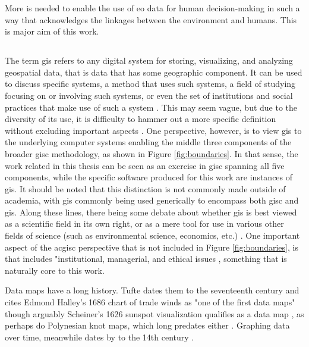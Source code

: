 More is needed to enable the use of \ac{eo} data for human decision-making in such a way that acknowledges the linkages between the environment and humans. This is major aim of this work. 

\subsection{} \label{sec:gis}

The term \ac{gis} refers to any digital system for storing, visualizing, and analyzing geospatial data, that is data that has some geographic component. It can be used to discuss specific systems, a method that uses such systems, a field of studying focusing on or involving such systems, or even the set of institutions and social practices that make use of such a system \cite{sheppardGISSocietyResearch1995}. This may seem vague, but due to the diversity of its use, it is difficulty to hammer out a more specific definition without excluding important aspects \cite{goodchildOverviewDefinitionGIS1992, picklesToolScienceGIS1997, chrismanWhatDoesGIS1999, heikkilaGISDeadLong1998}. One perspective, however, is to view \ac{gis} to the underlying computer systems enabling the middle three components of the broader \ac{gisc} methodology, as shown in Figure \ref{fig:boundaries}. In that sense, the work related in this thesis can be seen as an exercise in \ac{gisc} spanning all five components, while the specific software produced for this work are instances of \ac{gis}. It should be noted that this distinction is not commonly made outside of academia, with \ac{gis} commonly being used generically to encompass both \ac{gisc} and \ac{gis}. Along these lines, there being some debate about whether \ac{gis} is best viewed as a scientific field in its own right, or as a mere tool for use in various other fields of science (such as environmental science, economics, etc.) \cite{goodchildGeographicalInformationScience1992,goodchildTwentyYearsProgress2010}. One important aspect of the 
ac{gisc} perspective that is not included in Figure \ref{fig:boundaries}, is that includes "institutional, managerial, and ethical issues \cite{goodchildGeographicalInformationScience1992}, something that is naturally core to this work. 

Data maps have a long history. Tufte dates them to the seventeenth century and cites Edmond Halley's 1686 chart of trade winds as "one of the first data maps" \cite{tufteVisualDisplayQuantitative2001} though arguably Scheiner's 1626 sunspot visualization qualifies as a data map \cite{friendlyBriefHistoryData2008}, as perhaps do Polynesian knot maps, which long predates either \cite{davenportMarshallIslandsNavigational1960}. Graphing data over time, meanwhile dates by to the 14th century \cite{friendlyBriefHistoryData2008}.

